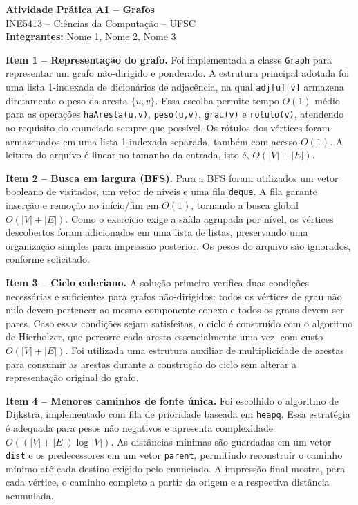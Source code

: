 \documentclass[10pt,a4paper]{article}
\begin{document}
\begin{center}
    {\Large \textbf{Atividade Prática A1 -- Grafos}}\\[2mm]
    INE5413 -- Ciências da Computação -- UFSC\\
    \textbf{Integrantes:} Nome 1, Nome 2, Nome 3
\end{center}

\textbf{Item 1 -- Representação do grafo.} Foi implementada a classe \texttt{Graph} para representar um grafo não-dirigido e ponderado. A estrutura principal adotada foi uma lista 1-indexada de dicionários de adjacência, na qual \texttt{adj[u][v]} armazena diretamente o peso da aresta \(\{u,v\}\). Essa escolha permite tempo \(O(1)\) médio para as operações \texttt{haAresta(u,v)}, \texttt{peso(u,v)}, \texttt{grau(v)} e \texttt{rotulo(v)}, atendendo ao requisito do enunciado sempre que possível. Os rótulos dos vértices foram armazenados em uma lista 1-indexada separada, também com acesso \(O(1)\). A leitura do arquivo é linear no tamanho da entrada, isto é, \(O(|V|+|E|)\).

\textbf{Item 2 -- Busca em largura (BFS).} Para a BFS foram utilizados um vetor booleano de visitados, um vetor de níveis e uma fila \texttt{deque}. A fila garante inserção e remoção no início/fim em \(O(1)\), tornando a busca global \(O(|V|+|E|)\). Como o exercício exige a saída agrupada por nível, os vértices descobertos foram adicionados em uma lista de listas, preservando uma organização simples para impressão posterior. Os pesos do arquivo são ignorados, conforme solicitado.

\textbf{Item 3 -- Ciclo euleriano.} A solução primeiro verifica duas condições necessárias e suficientes para grafos não-dirigidos: todos os vértices de grau não nulo devem pertencer ao mesmo componente conexo e todos os graus devem ser pares. Caso essas condições sejam satisfeitas, o ciclo é construído com o algoritmo de Hierholzer, que percorre cada aresta essencialmente uma vez, com custo \(O(|V|+|E|)\). Foi utilizada uma estrutura auxiliar de multiplicidade de arestas para consumir as arestas durante a construção do ciclo sem alterar a representação original do grafo.

\textbf{Item 4 -- Menores caminhos de fonte única.} Foi escolhido o algoritmo de Dijkstra, implementado com fila de prioridade baseada em \texttt{heapq}. Essa estratégia é adequada para pesos não negativos e apresenta complexidade \(O((|V|+|E|)\log |V|)\). As distâncias mínimas são guardadas em um vetor \texttt{dist} e os predecessores em um vetor \texttt{parent}, permitindo reconstruir o caminho mínimo até cada destino exigido pelo enunciado. A impressão final mostra, para cada vértice, o caminho completo a partir da origem e a respectiva distância acumulada.
\end{document}
